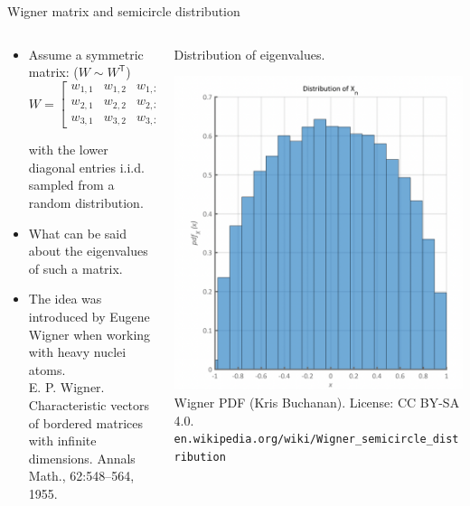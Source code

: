 \documentclass[english,aspectratio=1610]{beamer} %
\newcommand{\trnsp}{\mathsf{T}}
\begin{document}
\begin{frame}{Wigner matrix and semicircle distribution}

\begin{columns}[c]
	\begin{column}{70mm}
\begin{itemize}
\item 
Assume a symmetric matrix: ($W \sim W^\trnsp$)
\begin{equation*}
   W = 
    \begin{bmatrix}
        w_{1, 1} & w_{1, 2} & w_{1, 3}\\
        w_{2, 1} & w_{2, 2} & w_{2, 3}\\
        w_{3, 1} & w_{3, 2} & w_{3, 3}
    \end{bmatrix}
\end{equation*}

with the lower diagonal entries i.i.d. sampled from a random distribution. 
\item What can be said about the eigenvalues of such a matrix.

    \item The idea was introduced by Eugene Wigner when working with heavy nuclei atoms.\\
\vspace{10pt}
\tiny{E. P. Wigner. Characteristic vectors of bordered matrices with infinite dimensions.
Annals Math., 62:548–564, 1955.}
\end{itemize}
\end{column}
	\begin{column}{53mm}
	Distribution of eigenvalues.
	    \begin{center}
	        \includegraphics[width=.9\linewidth]{figures/wigner.png}
            \tiny{Wigner PDF (Kris Buchanan). License: CC BY-SA 4.0.}
            \tiny{\texttt{en.wikipedia.org/wiki/Wigner\_semicircle\_distribution}}
        \end{center}
	\end{column}
\end{columns}
\end{frame}
\end{document}
